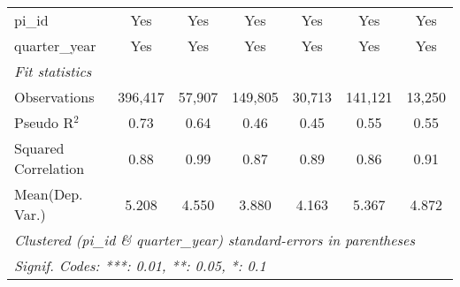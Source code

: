 \begin{tabular}{lcccccc}
   pi\_id                                                     & Yes            & Yes           & Yes           & Yes            & Yes           & Yes\\  
   quarter\_year                                              & Yes            & Yes           & Yes           & Yes            & Yes           & Yes\\  
   \midrule
   \emph{Fit statistics}\\
   Observations                                               & 396,417        & 57,907        & 149,805       & 30,713         & 141,121       & 13,250\\  
   Pseudo R$^2$                                               & 0.73           & 0.64          & 0.46          & 0.45           & 0.55          & 0.55\\  
   Squared Correlation                                        & 0.88           & 0.99          & 0.87          & 0.89           & 0.86          & 0.91\\  
Mean(Dep. Var.) & 5.208 & 4.550 & 3.880 & 4.163 & 5.367 & 4.872 \\
   \midrule \midrule
   \multicolumn{7}{l}{\emph{Clustered (pi\_id \& quarter\_year) standard-errors in parentheses}}\\
   \multicolumn{7}{l}{\emph{Signif. Codes: ***: 0.01, **: 0.05, *: 0.1}}\\
\end{tabular}
\par\endgroup

